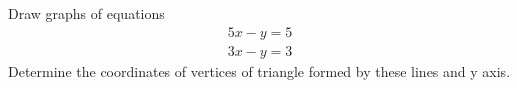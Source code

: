 Draw graphs of equations
\begin{align}
5x-y=5
\\
3x-y=3
\end{align}
Determine the coordinates of vertices of triangle formed by these lines and y axis.
